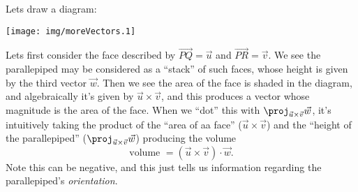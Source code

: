 Lets draw a diagram:
\begin{center}
\texttt{[image: img/moreVectors.1]}
\end{center}
Lets first consider the face described by $\overrightarrow{PQ}=\vec{u}$ and
$\overrightarrow{PR}=\vec{v}$. We see the parallepiped may be considered as a
``stack'' of such faces, whose height is given by the third
vector $\vec{w}$. Then we see the area of the face is shaded in
the diagram, and algebraically it's given by
$\vec{u}\times\vec{v}$, and this produces a vector whose
magnitude is the area of the face. When we ``dot'' this with
$\proj_{\vec{u}\times\vec{v}}\vec{w}$, it's intuitively taking the product of the ``area of
aa face'' ($\vec{u}\times\vec{v}$) and the ``height of the
parallepiped'' ($\proj_{\vec{u}\times\vec{v}}\vec{w}$) producing the volume 
\begin{equation}
\mbox{volume } = (\vec{u}\times\vec{v})\cdot\vec{w}.
\end{equation}
Note this can be negative, and this just tells us information
regarding the parallepiped's \emph{orientation}.

